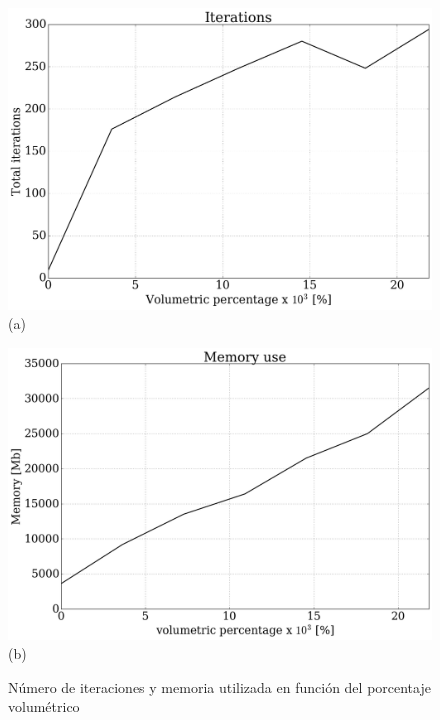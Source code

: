 \documentclass[12pt,letterpaper]{article}
\numberwithin{equation}{section}
\begin{document}
\begin{figure}[H]
	\begin{minipage}{0.5\linewidth}
		\centering\includegraphics[scale=0.26]{Imagenes/itplot.png}\\
		\centering(a)
	\end{minipage}
	\hspace{5mm}
	\begin{minipage}{0.5\linewidth}
		\centering\includegraphics[scale=0.26]{Imagenes/memory.png}\\
		\centering(b)
	\end{minipage}
	\caption{Número de iteraciones y memoria utilizada en función del porcentaje volumétrico}
	\label{fig:itvsnhilos}
\end{figure}

\end{document}
